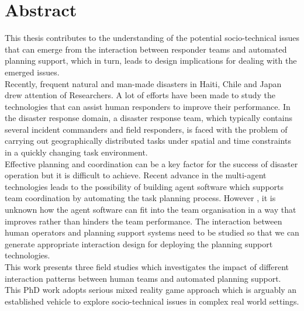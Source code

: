 \begingroup
\let\clearpage\relax
\let\cleardoublepage\relax
\let\cleardoublepage\relax

\chapter*{Abstract}
This thesis contributes to the understanding of the potential socio-technical issues that can emerge from the interaction between responder teams and automated planning support, which in turn, leads to design implications for dealing with the emerged issues. \\

Recently, frequent natural and man-made disasters in Haiti, Chile and Japan drew attention of Researchers. A lot of efforts have been made to study the technologies that can assist human responders to improve their performance. In the disaster response domain,  a disaster response team, which typically contains several incident commanders and field responders, is faced with the problem of carrying out geographically distributed tasks under spatial and time constraints in a quickly changing task environment. \\ 

Effective planning and coordination can be a key factor for the success of disaster operation but it is difficult to achieve. Recent advance in the multi-agent technologies leads to the possibility of building agent software which supports team coordination by automating the task planning process. However , it is unknown how the agent software can fit into the team organisation in a way that improves rather than hinders the team performance. The interaction between human operators and planning support systems need to be studied so that we can generate appropriate interaction design for deploying the planning support technologies.\\

This work presents three field studies which investigates the impact of different interaction patterns between human teams and automated  planning support. This PhD work adopts serious mixed reality game approach which is arguably an established vehicle to explore socio-technical issues in complex real world settings.\\

